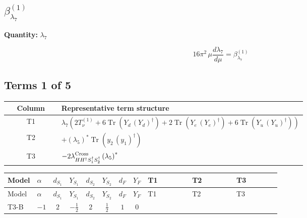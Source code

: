 \documentclass[8pt]{article}
\begin{document}
\begin{landscape}
\section*{$\beta_{\lambda_{7}}^{(1)}$}
\noindent\textbf{Quantity: }$\lambda_{7}$\par\smallskip
\[16\pi^2\,\mu\frac{d \lambda_{7}}{d\mu}=\beta_{\lambda_{7}}^{(1)}\]
\subsection*{Terms 1 of 5}
\begin{center}
\begin{tabular}{@{}c >{\raggedright\arraybackslash}p{0.82\linewidth}@{}}
\toprule
Column & Representative term structure \\
\midrule
T1 & \(\displaystyle {\lambda_{7}} (2 T_{\nu}^{(1)}+6 \operatorname{Tr}\!\left({Y_d}\,\left({Y_d}\right)^{\dagger}\right)+2 \operatorname{Tr}\!\left({Y_e}\,\left({Y_e}\right)^{\dagger}\right)+6 \operatorname{Tr}\!\left({Y_u}\,\left({Y_u}\right)^{\dagger}\right))\) \\
\midrule
T2 & \(\displaystyle +\left({\lambda_5}\right)^{*} \operatorname{Tr}\!\left({y_2}\,\left({y_1}\right)^{\dagger}\right)\) \\
\midrule
T3 & \(\displaystyle -2 {\lambda_{H H^\dagger S_1^\dagger S_2^\dagger}^{\rm Cross}} \left({\lambda_5}\right)^{*}\) \\
\midrule
\bottomrule
\end{tabular}
\end{center}
\smallskip
\tiny
\begin{longtable}{@{}llcccccc >{\raggedright\arraybackslash}p{0.21\linewidth} >{\raggedright\arraybackslash}p{0.21\linewidth} >{\raggedright\arraybackslash}p{0.21\linewidth}@{}}
\toprule
Model & $\alpha$ & $d_{S_1}$ & $Y_{S_1}$ & $d_{S_2}$ & $Y_{S_2}$ & $d_F$ & $Y_F$ & T1 & T2 & T3 \\
\midrule
\endfirsthead
\toprule
Model & $\alpha$ & $d_{S_1}$ & $Y_{S_1}$ & $d_{S_2}$ & $Y_{S_2}$ & $d_F$ & $Y_F$ & T1 & T2 & T3 \\
\midrule
\endhead
T3-B & $-1$ & $2$ & $-\frac{1}{2}$ & $2$ & $\frac{1}{2}$ & $1$ & $0$ & \scriptsize\adjustbox{max width=\linewidth}{$\begin{gathered} {\lambda_{7}} (2 T_{\nu}^{(1)}+6 \operatorname{Tr}\!\left({Y_d}\,\left({Y_d}\right)^{\dagger}\right)+2 \operatorname{Tr}\!\left({Y_e}\,\left({Y_e}\right)^{\dagger}\right)+6 \operatorname{Tr}\!\left({Y_u}\,\left({Y_u}\right)^{\dagger}\right))\end{gathered}$} & \scriptsize\adjustbox{max width=\linewidth}{$\begin{gathered} +\left({\lambda_5}\right)^{*} \operatorname{Tr}\!\left({y_2}\,\left({y_1}\right)^{\dagger}\right)\end{gathered}$} & \scriptsize\adjustbox{max width=\linewidth}{$\begin{gathered} -2 {\lambda_{H H^\dagger S_1^\dagger S_2^\dagger}^{\rm Cross}} \left({\lambda_5}\right)^{*}\end{gathered}$} \\

\end{longtable}
\end{landscape}
\end{document}
